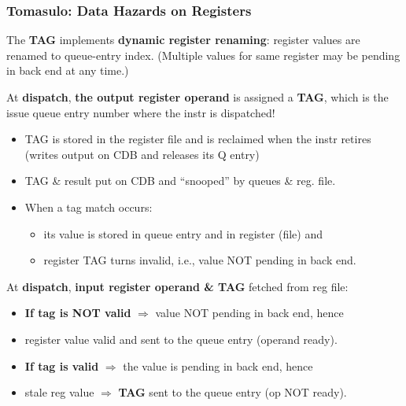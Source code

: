 \documentclass{beamer}
\newcommand{\emp}[1]{\textcolor{DikuRed}{ #1}}
\newcommand{\emphh}[1]{\textcolor{CosGreen}{ #1}}
\begin{document}
\begin{frame}[fragile,t]
\frametitle{Tomasulo: Data Hazards on Registers}
The \emphh{\bf TAG} implements \alert{\bf dynamic register renaming}: 
register values are renamed to queue-entry index. 
(Multiple values for same register may be pending in back end at any time.)\medskip


At \emp{\bf dispatch}, \emphh{\bf the output register operand} is assigned a 
\emphh{\bf TAG}, which is the issue queue entry number where the instr is dispatched!
\begin{itemize}
    \item TAG is stored in the register file and is reclaimed
            when the instr retires (writes output on CDB and releases its Q entry)
    \item TAG \& result put on CDB and ``snooped'' by queues \& reg. file.
    \item When a tag match occurs: 
            \begin{itemize}
                \item its value is stored in queue entry and in register (file) and 
                \item register TAG turns invalid, 
                        i.e., value NOT pending in back end.
            \end{itemize} 
\end  {itemize}
\medskip

At \emp{\bf dispatch}, \emphh{\bf input register operand \& TAG} fetched from reg file:
\begin{itemize}
    \item \emp{\bf If tag is NOT valid} $\Rightarrow$ value NOT pending in back end, hence
    \item register value valid and sent to the queue entry 
            (operand ready).\smallskip
    \item \emp{\bf If tag is valid} $\Rightarrow$ the value is pending in back end, hence
    \item stale reg value $\Rightarrow$ \emphh{\bf TAG} sent to the queue entry
            (op NOT ready).
\end  {itemize}
\end{frame}
\end{document}
